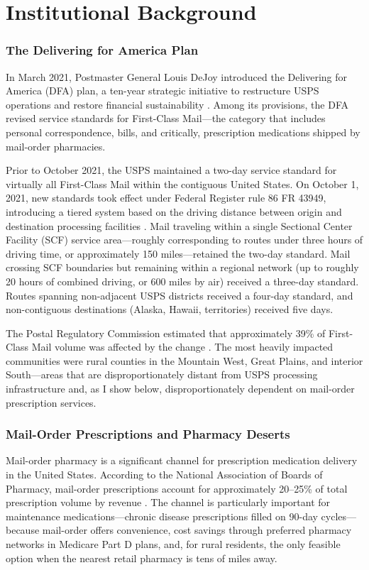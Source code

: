 \documentclass[12pt]{article}
\begin{document}
\section{Institutional Background}

\subsubsection*{The Delivering for America Plan} In March 2021, Postmaster General Louis DeJoy introduced the Delivering for America (DFA) plan, a ten-year strategic initiative to restructure USPS operations and restore financial sustainability \citep{usps2021delivering}. Among its provisions, the DFA revised service standards for First-Class Mail---the category that includes personal correspondence, bills, and critically, prescription medications shipped by mail-order pharmacies.

Prior to October 2021, the USPS maintained a two-day service standard for virtually all First-Class Mail within the contiguous United States. On October 1, 2021, new standards took effect under Federal Register rule 86 FR 43949, introducing a tiered system based on the driving distance between origin and destination processing facilities \citep{federalregister2021}. Mail traveling within a single Sectional Center Facility (SCF) service area---roughly corresponding to routes under three hours of driving time, or approximately 150 miles---retained the two-day standard. Mail crossing SCF boundaries but remaining within a regional network (up to roughly 20 hours of combined driving, or 600 miles by air) received a three-day standard. Routes spanning non-adjacent USPS districts received a four-day standard, and non-contiguous destinations (Alaska, Hawaii, territories) received five days.

The Postal Regulatory Commission estimated that approximately 39\% of First-Class Mail volume was affected by the change \citep{prc2021analysis}. The most heavily impacted communities were rural counties in the Mountain West, Great Plains, and interior South---areas that are disproportionately distant from USPS processing infrastructure and, as I show below, disproportionately dependent on mail-order prescription services.

\subsubsection*{Mail-Order Prescriptions and Pharmacy Deserts} Mail-order pharmacy is a significant channel for prescription medication delivery in the United States. According to the National Association of Boards of Pharmacy, mail-order prescriptions account for approximately 20--25\% of total prescription volume by revenue \citep{nabp2020report}. The channel is particularly important for maintenance medications---chronic disease prescriptions filled on 90-day cycles---because mail-order offers convenience, cost savings through preferred pharmacy networks in Medicare Part D plans, and, for rural residents, the only feasible option when the nearest retail pharmacy is tens of miles away.
\end{document}
